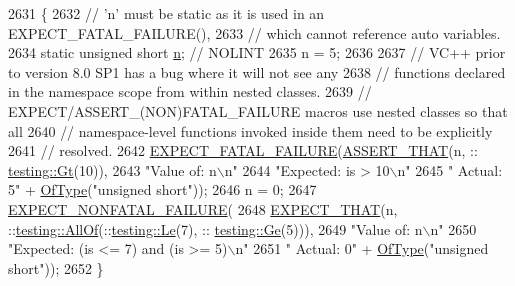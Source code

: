\begin{DoxyCode}
2631                                                            \{
2632   \textcolor{comment}{// 'n' must be static as it is used in an EXPECT\_FATAL\_FAILURE(),}
2633   \textcolor{comment}{// which cannot reference auto variables.}
2634   \textcolor{keyword}{static} \textcolor{keywordtype}{unsigned} \textcolor{keywordtype}{short} \hyperlink{app_2main_8cpp_acfc02ec89670db29251fda6a66602ce2}{n};  \textcolor{comment}{// NOLINT}
2635   n = 5;
2636 
2637   \textcolor{comment}{// VC++ prior to version 8.0 SP1 has a bug where it will not see any}
2638   \textcolor{comment}{// functions declared in the namespace scope from within nested classes.}
2639   \textcolor{comment}{// EXPECT/ASSERT\_(NON)FATAL\_FAILURE macros use nested classes so that all}
2640   \textcolor{comment}{// namespace-level functions invoked inside them need to be explicitly}
2641   \textcolor{comment}{// resolved.}
2642   \hyperlink{gtest-spi_8h_a819a3fd7f8b8cf24b6f1b3a26708973d}{EXPECT\_FATAL\_FAILURE}(\hyperlink{gmock-matchers_8h_a41d888579850c16583baea33ee8d057e}{ASSERT\_THAT}(n, ::
      \hyperlink{namespacetesting_a493fc1bafd7b3945ba06ace80e74b0d5}{testing::Gt}(10)),
2643                        \textcolor{stringliteral}{"Value of: n\(\backslash\)n"}
2644                        \textcolor{stringliteral}{"Expected: is > 10\(\backslash\)n"}
2645                        \textcolor{stringliteral}{"  Actual: 5"} + \hyperlink{namespacetesting_1_1gmock__matchers__test_a5d48d2ef7ca374de369c5f0a30e32343}{OfType}(\textcolor{stringliteral}{"unsigned short"}));
2646   n = 0;
2647   \hyperlink{gtest-spi_8h_a8376fd6821bd88fd806697355e79e138}{EXPECT\_NONFATAL\_FAILURE}(
2648       \hyperlink{gmock-matchers_8h_ac31e206123aa702e1152bb2735b31409}{EXPECT\_THAT}(n, ::\hyperlink{namespacetesting_af7618e8606c1cb45738163688944e2b7}{testing::AllOf}(::\hyperlink{namespacetesting_a2e33596921b80a7fdaff3f62bf18a478}{testing::Le}(7), ::
      \hyperlink{namespacetesting_a42bb19b42d7830b972973a103d5e00f2}{testing::Ge}(5))),
2649       \textcolor{stringliteral}{"Value of: n\(\backslash\)n"}
2650       \textcolor{stringliteral}{"Expected: (is <= 7) and (is >= 5)\(\backslash\)n"}
2651       \textcolor{stringliteral}{"  Actual: 0"} + \hyperlink{namespacetesting_1_1gmock__matchers__test_a5d48d2ef7ca374de369c5f0a30e32343}{OfType}(\textcolor{stringliteral}{"unsigned short"}));
2652 \}
\end{DoxyCode}
